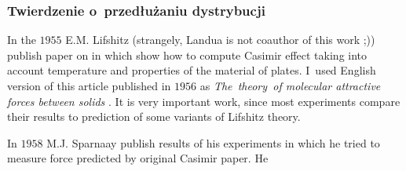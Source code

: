 \documentclass[10pt,t]{beamer}
\begin{document}
\begin{frame}
  \frametitle{Twierdzenie o~przedłużaniu dystrybucji}


  In the $1955$ E.M. Lifshitz (strangely, Landua is not coauthor of this work
  ;)) publish paper on in which show how to compute Casimir effect taking
  into account temperature and properties of the material of plates.
  I~used English version of this article published in $1956$ as
  \textit{The~theory~of molecular attractive forces between solids}
  \parencite{Lifshitz-The-theory-of-molecular-ETC-Pub-1956}.
  It is very important work, since most experiments compare their results
  to prediction of some variants of Lifshitz theory.

  In $1958$ M.J. Sparnaay publish results of his experiments in which he
  tried to measure force predicted by original Casimir paper. He

\end{frame}













\end{document}
